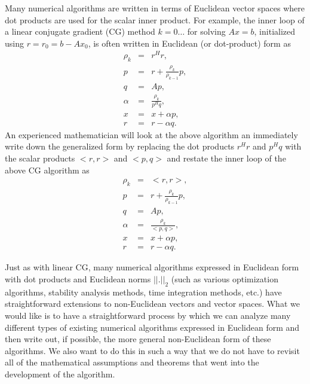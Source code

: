 \documentclass[pdf,ps2pdf,11pt]{SANDreport}
\begin{document}
Many numerical algorithms are written in terms of Euclidean vector spaces
where dot products are used for the scalar inner product.  For example, the
inner loop of a linear conjugate gradient (CG) method $k=0\ldots{}$ for
solving $A x = b$, initialized using $r = r_0 = b - A x_0$, is often written
in Euclidean (or dot-product) form as
%
\begin{eqnarray*}
\rho_k & = & r^H r, \\
p & = & r + \frac{\rho_k}{\rho_{k-1}} p, \\
q & = & A p, \\
\alpha & = & \frac{\rho_k}{p^H q}, \\
x & = & x + \alpha p, \\
r & = & r - \alpha q.
\end{eqnarray*}
%
An experienced mathematician will look at the above algorithm an immediately
write down the generalized form by replacing the dot products $r^H r$ and $p^H
q$ with the scalar products $<r,r>$ and $<p,q>$ and restate the inner loop of
the above CG algorithm as
%
\begin{eqnarray*}
\rho_k & = & <r,r>, \\
p & = & r + \frac{\rho_k}{\rho_{k-1}} p, \\
q & = & A p, \\
\alpha & = & \frac{\rho_k}{<p,q>}, \\
x & = & x + \alpha p, \\
r & = & r - \alpha q.
\end{eqnarray*}
%

Just as with linear CG, many numerical algorithms expressed in Euclidean form
with dot products and Euclidean norms $||.||_2$ (such as various optimization
algorithms, stability analysis methods, time integration methods, etc.) have
straightforward extensions to non-Euclidean vectors and vector spaces.  What we
would like is to have a straightforward process by which we can analyze many
different types of existing numerical algorithms expressed in Euclidean form
and then write out, if possible, the more general non-Euclidean form of these
algorithms.  We also want to do this in such a way that we do not have to
revisit all of the mathematical assumptions and theorems that went into the
development of the algorithm.
\end{document}
